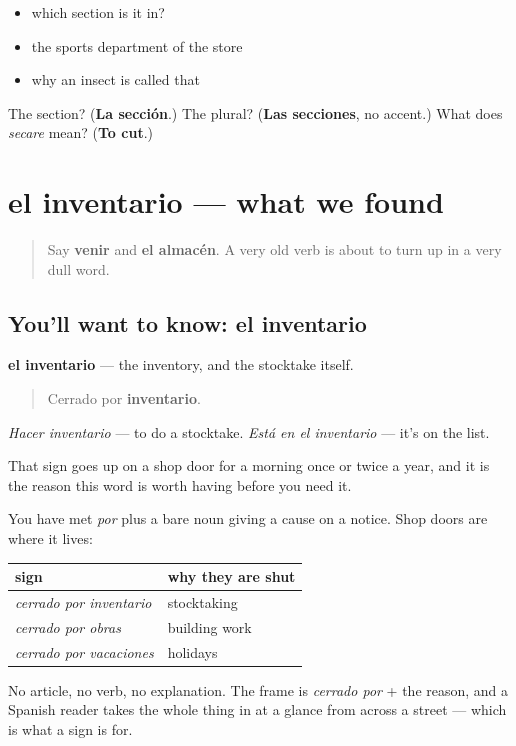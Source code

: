 \begin{itemize}
\raggedright
  \item which section is it in?
  \item the sports department of the store
  \item why an insect is called that
\end{itemize}

\begin{tcolorbox}[breakable,colback=teal!4,colframe=teal!35!black,title={Before you move on}]
The section? (\textbf{La sección}.) The plural? (\textbf{Las secciones}, no accent.) What does \emph{secare} mean? (\textbf{To cut}.)
\end{tcolorbox}
\section[el inventario]{el inventario — what we found}

\label{lesson:ES-C459-inventario}



\begin{quote}
Say \textbf{venir} and \textbf{el almacén}. A very old verb is about to turn up in a very dull word.
\end{quote}

\subsection*{You'll want to know: el inventario}
\textbf{el inventario} — the inventory, and the stocktake itself.

\begin{quote}
Cerrado por \textbf{inventario}.
\end{quote}

\emph{Hacer inventario} — to do a stocktake. \emph{Está en el inventario} — it's on the list.

That sign goes up on a shop door for a morning once or twice a year, and it is the reason this word is worth having before you need it.

\begin{grammarlens}[title={Grammar Lens: cerrado por — the cause on a door}]
You have met \emph{por} plus a bare noun giving a cause on a notice. Shop doors are where it lives:

\noindent
\begin{tabularx}{\linewidth}{@{}>{\raggedright\arraybackslash}X>{\raggedright\arraybackslash}X@{}}
\toprule
\textbf{sign} & \textbf{why they are shut} \\
\midrule
\emph{cerrado por inventario} & stocktaking \\
\emph{cerrado por obras} & building work \\
\emph{cerrado por vacaciones} & holidays \\
\bottomrule
\end{tabularx}

No article, no verb, no explanation. The frame is \emph{cerrado por} + the reason, and a Spanish reader takes the whole thing in at a glance from across a street — which is what a sign is for.
\end{grammarlens}

